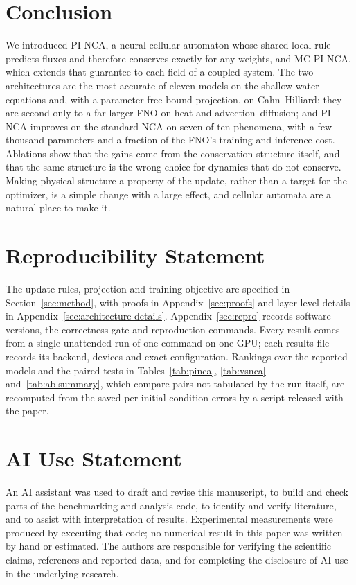 \documentclass{article}
\begin{document}
\section{Conclusion}
We introduced PI-NCA, a neural cellular automaton whose shared local rule predicts fluxes
and therefore conserves exactly for any weights, and MC-PI-NCA, which extends that
guarantee to each field of a coupled system. The two architectures are the most accurate
of eleven models on the shallow-water equations and, with a parameter-free bound
projection, on Cahn--Hilliard; they are second only to a far larger FNO on heat and
advection--diffusion; and PI-NCA improves on the standard NCA on seven of ten phenomena,
with a few thousand parameters and a fraction of the FNO's training and inference cost.
Ablations show that the gains come from the conservation structure itself, and that the
same structure is the wrong choice for dynamics that do not conserve. Making physical
structure a property of the update, rather than a target for the optimizer, is a simple
change with a large effect, and cellular automata are a natural place to make it.
\label{sec:main-end}

\clearpage
\section*{Reproducibility Statement}
The update rules, projection and training objective are specified in
Section~\ref{sec:method}, with proofs in Appendix~\ref{sec:proofs} and layer-level details
in Appendix~\ref{sec:architecture-details}. Appendix~\ref{sec:repro} records software
versions, the correctness gate and reproduction commands. Every result comes from a single
unattended run of one command on one GPU; each results file records its backend, devices
and exact configuration. Rankings over the reported models and the paired tests in
Tables~\ref{tab:pinca}, \ref{tab:vsnca} and~\ref{tab:ablsummary}, which compare pairs not
tabulated by the run itself, are recomputed from the saved per-initial-condition errors by
a script released with the paper.

\section*{AI Use Statement}
An AI assistant was used to draft and revise this manuscript, to build and check parts of
the benchmarking and analysis code, to identify and verify literature, and to assist with
interpretation of results. Experimental measurements were produced by executing that
code; no numerical result in this paper was written by hand or estimated. The authors are
responsible for verifying the scientific claims, references and reported data, and for
completing the disclosure of AI use in the underlying research.
\end{document}
